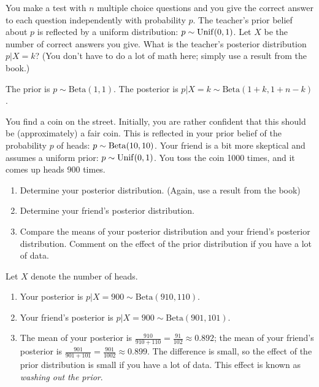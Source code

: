 \begin{exercise}
You make a test with $n$ multiple choice questions and you give the correct answer to each question independently with probability $p$. The teacher's prior belief about $p$ is reflected by a uniform distribution: $p \sim \mathrm{Unif}(0,1)$.
Let $X$ be the number of correct answers you give.
What is the teacher's posterior distribution $p|X=k$? (You don't have to do a lot of math here; simply use a result from the book.)
\begin{solution}
The prior is $p \sim \text{Beta}(1,1)$. The posterior is $p|X=k \sim \text{Beta}(1+k,1+n-k)$.
\end{solution}
\end{exercise}

\begin{exercise}
You find a coin on the street. Initially, you are rather confident that this should be (approximately) a fair coin. This is reflected in your prior belief of the probability $p$ of heads: $p \sim \mathrm{Beta}(10,10)$. Your friend is a bit more skeptical and assumes a uniform prior: $p \sim \mathrm{Unif}(0,1)$.  You toss the coin 1000 times, and it comes up heads 900 times.
\begin{enumerate}
\item Determine your posterior distribution. (Again, use  a result from the book)
\item Determine your friend's posterior distribution.
\item Compare the means of your posterior distribution and your friend's posterior distribution. Comment on the effect of the prior distribution if you have a lot of data.
\end{enumerate}
\begin{solution}
Let $X$ denote the number of heads.
\begin{enumerate}
    \item Your posterior is $p|X=900 \sim \text{Beta}(910,110)$.
    \item Your friend's posterior is $p|X=900 \sim \text{Beta}(901,101)$.
    \item The mean of your posterior is $\frac{910}{910+110} = \frac{91}{102} \approx 0.892$; the mean of your friend's posterior is  $\frac{901}{901+101} = \frac{901}{1002} \approx 0.899$. The difference is small, so the  effect of the prior distribution is small if you have a lot of data. This effect is known as \textit{washing out the prior}.
\end{enumerate}
\end{solution}
\end{exercise}


